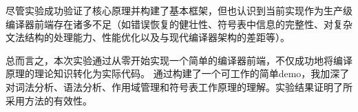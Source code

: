 尽管实验成功验证了核心原理并构建了基本框架，但也认识到当前实现作为生产级编译器前端存在诸多不足（如错误恢复的健壮性、符号表中信息的完整性、对复杂文法结构的处理能力、性能优化以及与现代编译器架构的差距等）。

总而言之，本次实验通过从零开始实现一个简单的编译器前端，不仅成功地将编译原理的理论知识转化为实际代码。 通过构建了一个可工作的简单demo，我加深了对词法分析、语法分析、作用域管理和符号表工作原理的理解。实验结果证明了所采用方法的有效性。